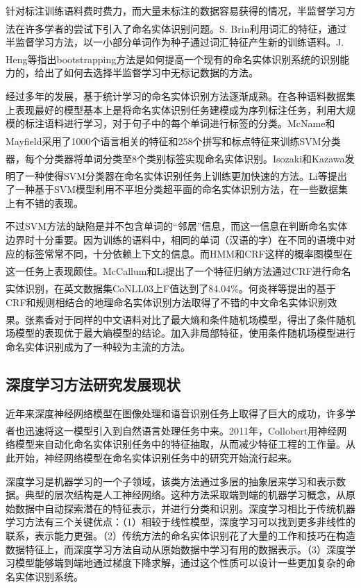 \documentclass[winfonts,master,oneside,nobackinfo]{njuthesis}
\newcommand{\upcite}[1]{\textsuperscript{\textsuperscript{\cite{#1}}}}
\begin{document}
针对标注训练语料费时费力，而大量未标注的数据容易获得的情况，半监督学习方法在许多学者的尝试下引入了命名实体识别问题。S. Brin\upcite{Brin}利用词汇的特征，通过半监督学习方法，以一小部分单词作为种子通过词汇特征产生新的训练语料。J. Heng等\upcite{Heng}指出bootstrapping方法是如何提高一个现有的命名实体识别系统的识别能力的，给出了如何去选择半监督学习中无标记数据的方法。

经过多年的发展，基于统计学习的命名实体识别方法逐渐成熟。在各种语料数据集上表现最好的模型基本上是将命名实体识别任务建模成为序列标注任务，利用大规模的标注语料进行学习，对于句子中的每个单词进行标签的分类。McName和Mayfield\upcite{McName}采用了1000个语言相关的特征和258个拼写和标点特征来训练SVM分类器，每个分类器将单词分类至8个类别标签实现命名实体识别。Isozaki和Kazawa\upcite{Isozki}发明了一种使得SVM分类器在命名实体识别任务上训练更加快速的方法。Li等\upcite{Li}提出了一种基于SVM模型利用不平坦分类超平面的命名实体识别方法，在一些数据集上有不错的表现。

不过SVM方法的缺陷是并不包含单词的“邻居”信息，而这一信息在判断命名实体边界时十分重要。因为训练的语料中，相同的单词（汉语的字）在不同的语境中对应的标签常常不同，十分依赖上下文的信息。而HMM和CRF这样的概率图模型在这一任务上表现颇佳。McCallum和Li\upcite{McCallum}提出了一个特征归纳方法通过CRF进行命名实体识别，在英文数据集CoNLL03上F值达到了84.04\%。何炎祥等\upcite{hyx}提出的基于CRF和规则相结合的地理命名实体识别方法取得了不错的中文命名实体识别效果。张素香\upcite{zsx}对于同样的中文语料对比了最大熵和条件随机场模型，得出了条件随机场模型的表现优于最大熵模型的结论。加入非局部特征，使用条件随机场模型进行命名实体识别成为了一种较为主流的方法。

\subsection{深度学习方法研究发展现状}
近年来深度神经网络模型在图像处理和语音识别任务上取得了巨大的成功，许多学者也迅速将这一模型引入到自然语言处理任务中来。2011年，Collobert\upcite{Collobert}用神经网络模型来自动化命名实体识别任务中的特征抽取，从而减少特征工程的工作量。从此开始，神经网络模型在命名实体识别任务中的研究开始流行起来。

深度学习是机器学习的一个子领域，该类方法通过多层的抽象层来学习和表示数据。典型的层次结构是人工神经网络。这种方法采取端到端的机器学习概念，从原始数据中自动探索潜在的特征表示，并进行分类和识别。深度学习相比于传统机器学习方法有三个关键优点：（1）相较于线性模型，深度学习可以找到更多非线性的联系，表示能力更强。（2）传统方法的命名实体识别花了大量的工作和技巧在构造数据特征上，而深度学习方法自动从原始数据中学习有用的数据表示。（3）深度学习模型能够端到端地通过梯度下降求解，通过这个性质可以设计一些更加复杂的命名实体识别系统。
\end{document}

